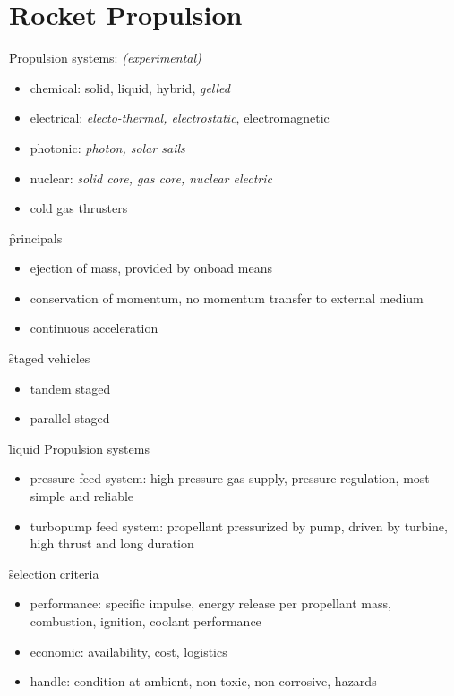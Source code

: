\section{Rocket Propulsion}

\f{Propulsion systems:} \textit{(experimental)}
\begin{itemize}
 \item chemical: solid, liquid, hybrid, \textit{gelled}
 \item electrical: \textit{electo-thermal, electrostatic}, electromagnetic
 \item photonic: \textit{photon, solar sails}
 \item nuclear: \textit{solid core, gas core, nuclear electric}
 \item cold gas thrusters
\end{itemize}

\f{principals}
\begin{itemize}
 \item ejection of mass, provided by onboad means
 \item conservation of momentum, no momentum transfer to external medium
 \item continuous acceleration
\end{itemize}

\f{staged vehicles}
\begin{itemize}
 \item tandem staged
 \item parallel staged
\end{itemize}

\f{liquid Propulsion systems}
\begin{itemize}
 \item pressure feed system: high-pressure gas supply, pressure regulation, most simple and reliable
 \item turbopump feed system: propellant pressurized by pump, driven by turbine, high thrust and long duration
\end{itemize}

\f{selection criteria}
\begin{itemize}
 \item performance: specific impulse, energy release per propellant mass, combustion, ignition, coolant performance
 \item economic: availability, cost, logistics
 \item handle: condition at ambient, non-toxic, non-corrosive, hazards
\end{itemize}

